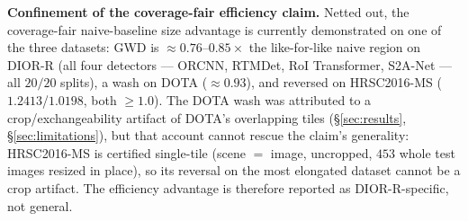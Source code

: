 \documentclass[11pt]{article}
\begin{document}
\textbf{Confinement of the coverage-fair efficiency claim.} Netted out, the coverage-fair naive-baseline size
advantage is currently demonstrated on one of the three datasets: GWD is $\approx0.76$--$0.85\times$ the
like-for-like naive region on DIOR-R (all four detectors --- ORCNN, RTMDet, RoI Transformer, S2A-Net --- all
$20/20$ splits), a wash on DOTA
($\approx0.93$), and reversed on HRSC2016-MS ($1.2413$/$1.0198$, both $\ge1.0$). The DOTA wash was
attributed to a crop/exchangeability artifact of DOTA's overlapping tiles (\S\ref{sec:results},
\S\ref{sec:limitations}), but that account cannot rescue the claim's generality: HRSC2016-MS is certified
single-tile (scene $=$ image, uncropped, $453$ whole test images resized in place), so its reversal
on the most elongated dataset cannot be a crop artifact. The efficiency advantage is therefore reported as
DIOR-R-specific, not general.
\end{document}
